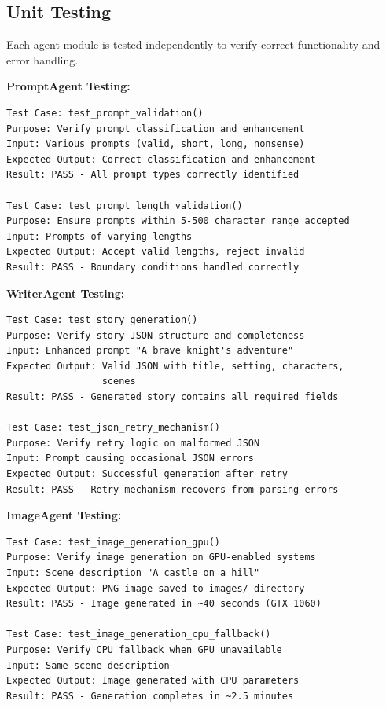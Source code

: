 \subsection{Unit Testing}

Each agent module is tested independently to verify correct functionality and error handling.

\textbf{PromptAgent Testing:}

\begin{verbatim}
Test Case: test_prompt_validation()
Purpose: Verify prompt classification and enhancement
Input: Various prompts (valid, short, long, nonsense)
Expected Output: Correct classification and enhancement
Result: PASS - All prompt types correctly identified

Test Case: test_prompt_length_validation()
Purpose: Ensure prompts within 5-500 character range accepted
Input: Prompts of varying lengths
Expected Output: Accept valid lengths, reject invalid
Result: PASS - Boundary conditions handled correctly
\end{verbatim}

\textbf{WriterAgent Testing:}

\begin{verbatim}
Test Case: test_story_generation()
Purpose: Verify story JSON structure and completeness
Input: Enhanced prompt "A brave knight's adventure"
Expected Output: Valid JSON with title, setting, characters, 
                 scenes
Result: PASS - Generated story contains all required fields

Test Case: test_json_retry_mechanism()
Purpose: Verify retry logic on malformed JSON
Input: Prompt causing occasional JSON errors
Expected Output: Successful generation after retry
Result: PASS - Retry mechanism recovers from parsing errors
\end{verbatim}

\textbf{ImageAgent Testing:}

\begin{verbatim}
Test Case: test_image_generation_gpu()
Purpose: Verify image generation on GPU-enabled systems
Input: Scene description "A castle on a hill"
Expected Output: PNG image saved to images/ directory
Result: PASS - Image generated in ~40 seconds (GTX 1060)

Test Case: test_image_generation_cpu_fallback()
Purpose: Verify CPU fallback when GPU unavailable
Input: Same scene description
Expected Output: Image generated with CPU parameters
Result: PASS - Generation completes in ~2.5 minutes
\end{verbatim}

